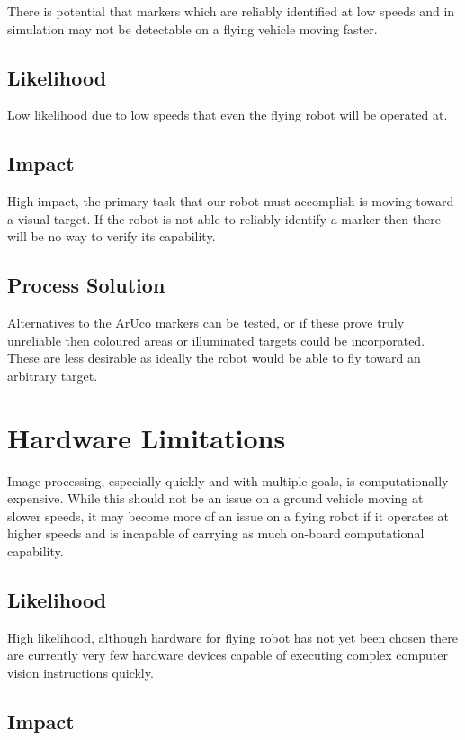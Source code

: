 \documentclass[]{report}
\begin{document}
There is potential that markers which are reliably identified at low speeds and in simulation may not be detectable on a flying vehicle moving faster.

\subsection{Likelihood}

Low likelihood due to low speeds that even the flying robot will be operated at.

\subsection{Impact}

High impact, the primary task that our robot must accomplish is moving toward a visual target. If the robot is not able to reliably identify a marker then there will be no way to verify its capability.

\subsection{Process Solution}

Alternatives to the ArUco markers can be tested, or if these prove truly unreliable then coloured areas or illuminated targets could be incorporated. These are less desirable as ideally the robot would be able to fly toward an arbitrary target.

\section{Hardware Limitations}

Image processing, especially quickly and with multiple goals, is computationally expensive. While this should not be an issue on a ground vehicle moving at slower speeds, it may become more of an issue on a flying robot if it operates at higher speeds and is incapable of carrying as much on-board computational capability.

\subsection{Likelihood}

High likelihood, although hardware for flying robot has not yet been chosen there are currently very few hardware devices capable of executing complex computer vision instructions quickly. 

\subsection{Impact}
\end{document}
